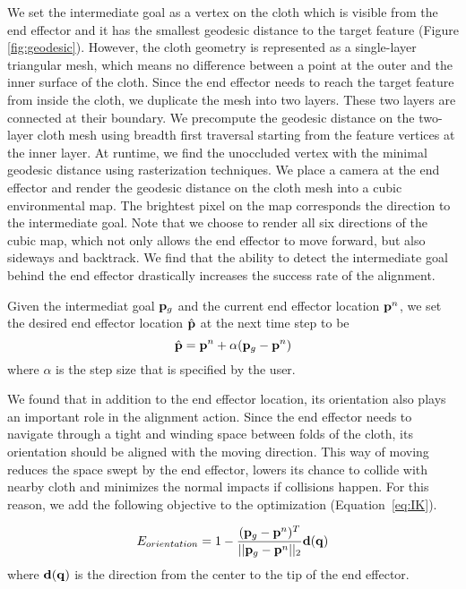 We set the intermediate goal as a vertex on the cloth which is visible from the end effector and it has the smallest geodesic distance to the target feature (Figure \ref{fig:geodesic}). However, the cloth geometry is represented as a single-layer triangular mesh, which means no difference between a point at the outer and the inner surface of the cloth. Since the end effector needs to reach the target feature from inside the cloth, we duplicate the mesh into two layers. These two layers are connected at their boundary. We precompute the geodesic distance on the two-layer cloth mesh using breadth first traversal starting from the feature vertices at the inner layer. At runtime, we find the unoccluded vertex with the minimal geodesic distance using rasterization techniques. We place a camera at the end effector and render the geodesic distance on the cloth mesh into a cubic environmental map. The brightest pixel on the map corresponds the direction to the intermediate goal. Note that we choose to render all six directions of the cubic map, which not only allows the end effector to move forward, but also sideways and backtrack. We find that the ability to detect the intermediate goal behind the end effector drastically increases the success rate of the alignment.

Given the intermediat goal $\mathbf{p}_g$ and the current end effector location $\mathbf{p}^n$, we set the desired end effector location $\hat{\mathbf{p}}$ at the next time step to be 
\begin{equation}
  \hat{\mathbf{p}} = \mathbf{p}^n+\alpha(\mathbf{p}_g - \mathbf{p}^n)
  \label{eq:target}
\end{equation}
where $\alpha$ is the step size that is specified by the user.

We found that in addition to the end effector location, its orientation also plays an important role in the alignment action. Since the end effector needs to navigate through a tight and winding space between folds of the cloth, its orientation should be aligned with the moving direction. This way of moving reduces the space swept by the end effector, lowers its chance to collide with nearby cloth and minimizes the normal impacts if collisions happen. For this reason, we add the following objective to the optimization (Equation~\ref{eq:IK}). 

\begin{displaymath}
E_{orientation} = 1-\frac{(\mathbf{p}_g-\mathbf{p}^n)^T}{||\mathbf{p}_g-\mathbf{p}^n||_2}\mathbf{d(q})
\end{displaymath}
where $\mathbf{d(q)}$ is the direction from the center to the tip of the end effector.

